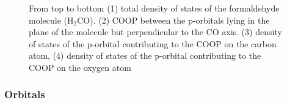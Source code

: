 \documentclass[final,12pt]{article}
\begin{document}
{{{{{{\begin{figure}
\centerline{
}
 \caption{From top to bottom (1) total density of states of the 
   formaldehyde molecule (H$_2$CO). (2) COOP between the p-orbitals
   lying in the plane of the molecule but perpendicular to the CO
   axis. (3) density of states of the p-orbital contributing to the
   COOP on the carbon atom, (4) density of states of the p-orbital
   contributing to the COOP on the oxygen atom}
\label{fig:h2copdos}
\end{figure}

\subsubsection{Orbitals}

}}}}}}
\end{document}
